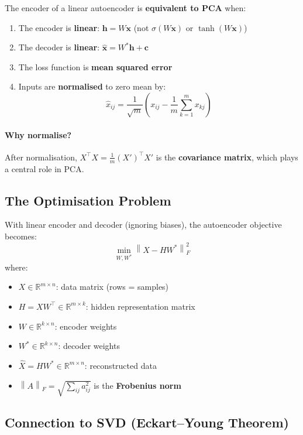 \documentclass[12pt,a4paper]{article}
\newcommand{\R}{\mathbb{R}}
\newcommand{\norm}[1]{\left\|#1\right\|}
\newcommand{\vx}{\mathbf{x}}
\newcommand{\vh}{\mathbf{h}}
\newcommand{\vc}{\mathbf{c}}
\newcommand{\hatx}{\hat{\mathbf{x}}}
\begin{document}
\begin{theorembox}
The encoder of a linear autoencoder is \textbf{equivalent to PCA} when:
\begin{enumerate}
  \item The encoder is \textbf{linear}: $\vh = W\vx$ (not $\sigma(W\vx)$ or $\tanh(W\vx)$)
  \item The decoder is \textbf{linear}: $\hatx = W^*\vh + \vc$
  \item The loss function is \textbf{mean squared error}
  \item Inputs are \textbf{normalised} to zero mean by:
    \[
      \hat{x}_{ij} = \frac{1}{\sqrt{m}}\left(x_{ij} - \frac{1}{m}\sum_{k=1}^{m}x_{kj}\right)
    \]
\end{enumerate}
\end{theorembox}

\paragraph{Why normalise?} After normalisation, $X^\top X = \frac{1}{m}(X')^\top X'$ is the \textbf{covariance matrix}, which plays a central role in PCA.

\subsection{The Optimisation Problem}

With linear encoder and decoder (ignoring biases), the autoencoder objective becomes:
\[
  \min_{W,W^*} \norm{X - HW^*}_F^2
\]
where:
\begin{itemize}
  \item $X \in \R^{m\times n}$: data matrix (rows = samples)
  \item $H = XW^\top \in \R^{m\times k}$: hidden representation matrix
  \item $W \in \R^{k\times n}$: encoder weights
  \item $W^* \in \R^{k\times n}$: decoder weights
  \item $\hat{X} = HW^* \in \R^{m\times n}$: reconstructed data
  \item $\norm{A}_F = \sqrt{\sum_{ij}a_{ij}^2}$ is the \textbf{Frobenius norm}
\end{itemize}

\subsection{Connection to SVD (Eckart--Young Theorem)}
\end{document}
